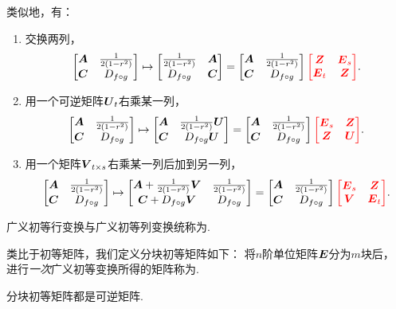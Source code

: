 类似地，有：
\begin{enumerate}
	\item 交换两列，\[
		\begin{bmatrix} \boldsymbol{A} & \frac{1}{2(1-r^2)} \\ \boldsymbol{C} & D_{f \circ g} \end{bmatrix}
		\mapsto \begin{bmatrix}
			\frac{1}{2(1-r^2)} & \boldsymbol{A} \\
			D_{f \circ g} & \boldsymbol{C}
		\end{bmatrix}
		= \begin{bmatrix} \boldsymbol{A} & \frac{1}{2(1-r^2)} \\ \boldsymbol{C} & D_{f \circ g} \end{bmatrix} {\color{red} \begin{bmatrix}
			\boldsymbol{Z}& \boldsymbol{E}_s \\
			\boldsymbol{E}_t & \boldsymbol{Z}\end{bmatrix}}.
	\]

	\item 用一个可逆矩阵\(\P_t\)右乘某一列，\[
		\OriginalMatrix
		\mapsto \begin{bmatrix}
			\A & \B\P \\
			\C & \D\P
		\end{bmatrix}
		= \OriginalMatrix {\color{red} \begin{bmatrix}
			\E_s & \z \\
			\z & \P
		\end{bmatrix}}.
	\]

	\item 用一个矩阵\(\Q_{t \times s}\)右乘某一列后加到另一列，\[
		\OriginalMatrix
		\mapsto \begin{bmatrix}
			\A + \B\Q & \B \\
			\C + \D\Q & \D
		\end{bmatrix}
		= \OriginalMatrix {\color{red} \begin{bmatrix}
			\E_s & \z \\
			\Q & \E_t
		\end{bmatrix}}.
	\]
\end{enumerate}

广义初等行变换与广义初等列变换统称为.

类比于初等矩阵，我们定义分块初等矩阵如下：
将\(n\)阶单位矩阵\(\boldsymbol{E}\)分为\(m\)块后，
进行\emph{一次}广义初等变换所得的矩阵称为.

\begin{property}
分块初等矩阵都是可逆矩阵.
\end{property}
